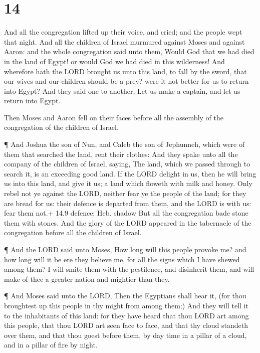 \hypertarget{section-13}{%
\section{14}\label{section-13}}

 And all the congregation lifted up their voice, and cried;
and the people wept that night.  And all the children of
Israel murmured against Moses and against Aaron: and the whole
congregation said unto them, Would God that we had died in the land of
Egypt! or would God we had died in this wilderness!  And
wherefore hath the LORD brought us unto this land, to fall by the sword,
that our wives and our children should be a prey? were it not better for
us to return into Egypt?  And they said one to another, Let
us make a captain, and let us return into Egypt.

 Then Moses and Aaron fell on their faces before all the
assembly of the congregation of the children of Israel.

 ¶ And Joshua the son of Nun, and Caleb the son of
Jephunneh, which were of them that searched the land, rent their
clothes:  And they spake unto all the company of the
children of Israel, saying, The land, which we passed through to search
it, is an exceeding good land.  If the LORD delight in us,
then he will bring us into this land, and give it us; a land which
floweth with milk and honey.  Only rebel not ye against the
LORD, neither fear ye the people of the land; for they are bread for us:
their defence is departed from them, and the LORD is with us: fear them
not.+ 14.9 defence: Heb. shadow  But all the congregation
bade stone them with stones. And the glory of the LORD appeared in the
tabernacle of the congregation before all the children of Israel.

 ¶ And the LORD said unto Moses, How long will this people
provoke me? and how long will it be ere they believe me, for all the
signs which I have shewed among them?  I will smite them
with the pestilence, and disinherit them, and will make of thee a
greater nation and mightier than they.

 ¶ And Moses said unto the LORD, Then the Egyptians shall
hear it, (for thou broughtest up this people in thy might from among
them;)  And they will tell it to the inhabitants of this
land: for they have heard that thou LORD art among this people, that
thou LORD art seen face to face, and that thy cloud standeth over them,
and that thou goest before them, by day time in a pillar of a cloud, and
in a pillar of fire by night.

